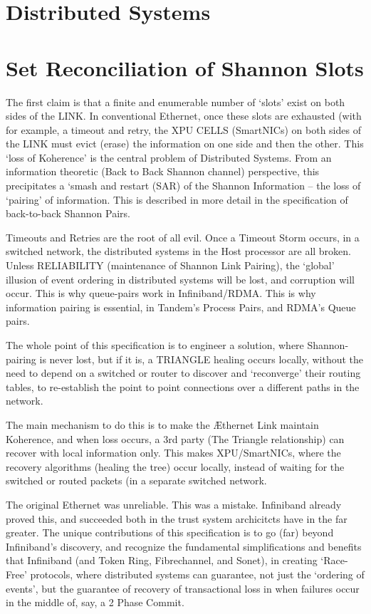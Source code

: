 \documentclass[../HFT-main.tex]{subfiles}
\begin{document}
 


\section{Distributed Systems}


\section{Set Reconciliation of Shannon Slots}

The first claim is that a finite and enumerable number of  `slots' exist on both sides of the LINK. In conventional Ethernet, once these slots are exhausted (with for example, a timeout and retry, the XPU CELLS (SmartNICs) on both sides of the LINK must evict (erase) the information on one side and then the other. This `loss of Koherence' is the central problem of Distributed Systems.  From an information theoretic (Back to Back Shannon channel) perspective, this precipitates a `smash and restart (SAR) of the Shannon Information --  the loss of `pairing' of information. This is described in more detail in the specification of back-to-back Shannon Pairs.

Timeouts and Retries are the root of all evil.  Once a Timeout Storm occurs, in a switched network, the distributed systems in the Host processor are all broken. Unless RELIABILITY (maintenance of Shannon Link Pairing),  the `global' illusion of event ordering in distributed systems will be lost, and corruption will occur.  This is why queue-pairs work in Infiniband/RDMA. This is why information pairing is essential, in Tandem's Process Pairs, and RDMA's Queue pairs.

The whole point of this specification is to engineer a solution, where Shannon-pairing is never lost, but if it is, a TRIANGLE healing occurs locally, without the need to depend on a switched or router to discover and  `reconverge' their routing tables, to re-establish the point to point connections over a different paths in the network.  

The main mechanism to do this is to make the Æthernet Link maintain Koherence, and when loss occurs, a 3rd party (The Triangle relationship) can recover with local information only. This makes XPU/SmartNICs, where the recovery algorithms (healing the tree) occur locally, instead of waiting for the switched or routed packets (in a separate switched network.

The original Ethernet was unreliable. This was a mistake. Infiniband already proved this, and succeeded both in the trust system archicitcts have in the far greater. The unique contributions of this specification is to go (far) beyond Infiniband's discovery, and recognize the fundamental simplifications and benefits that Infiniband (and Token Ring,  Fibrechannel, and Sonet), in creating `Race-Free' protocols, where distributed systems can guarantee, not just the `ordering of events', but the guarantee of recovery of transactional loss in when failures occur in the middle of, say, a 2 Phase Commit. 
\end{document}
